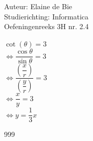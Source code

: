 \documentclass[a4paper]{article}
\begin{document}
\noindent \large Auteur: Elaine de Bie \\
\noindent \large Studierichting: Informatica\\
\noindent \large Oefeningenreeks 3H nr. 2.4\


\medskip

\normalsize


$ \cot(\theta) = 3 $ \\

$ \Leftrightarrow \dfrac{\cos \theta}{\sin \theta} = 3 $ \\

$ \Leftrightarrow \dfrac{\left(\dfrac{x}{r}\right)}{\left(\dfrac{y}{r}\right)} = 3 $\\

$ \Leftrightarrow \dfrac{x}{y} = 3 $\\

$ \Leftrightarrow y = \dfrac{1}{3}x $\\



\begin{thebibliography}{999}
\end{thebibliography}
\end{document}
